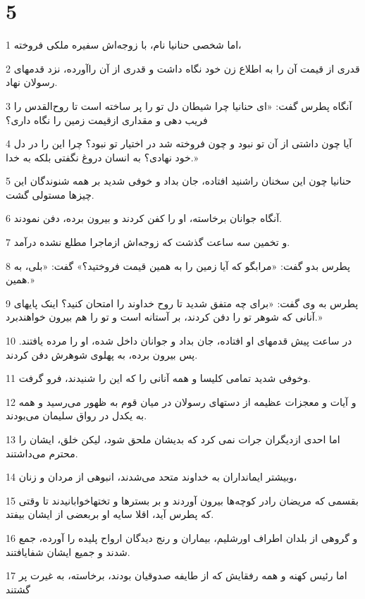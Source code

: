 \chapter{5}

\par 1 اما شخصی حنانیا نام، با زوجه‌اش سفیره ملکی فروخته،
\par 2 قدری از قیمت آن را به اطلاع زن خود نگاه داشت و قدری از آن راآورده، نزد قدمهای رسولان نهاد.
\par 3 آنگاه پطرس گفت: «ای حنانیا چرا شیطان دل تو را پر ساخته است تا روح‌القدس را فریب دهی و مقداری ازقیمت زمین را نگاه داری؟
\par 4 آیا چون داشتی از آن تو نبود و چون فروخته شد در اختیار تو نبود؟ چرا این را در دل خود نهادی؟ به انسان دروغ نگفتی بلکه به خدا.»
\par 5 حنانیا چون این سخنان راشنید افتاده، جان بداد و خوفی شدید بر همه شنوندگان این چیزها مستولی گشت.
\par 6 آنگاه جوانان برخاسته، او را کفن کردند و بیرون برده، دفن نمودند.
\par 7 و تخمین سه ساعت گذشت که زوجه‌اش ازماجرا مطلع نشده درآمد.
\par 8 پطرس بدو گفت: «مرابگو که آیا زمین را به همین قیمت فروختید؟» گفت: «بلی، به همین.»
\par 9 پطرس به وی گفت: «برای چه متفق شدید تا روح خداوند را امتحان کنید؟ اینک پایهای آنانی که شوهر تو را دفن کردند، بر آستانه است و تو را هم بیرون خواهندبرد.»
\par 10 در ساعت پیش قدمهای او افتاده، جان بداد و جوانان داخل شده، او را مرده یافتند. پس بیرون برده، به پهلوی شوهرش دفن کردند.
\par 11 وخوفی شدید تمامی کلیسا و همه آنانی را که این را شنیدند، فرو گرفت.
\par 12 و آیات و معجزات عظیمه از دستهای رسولان در میان قوم به ظهور می‌رسید و همه به یکدل در رواق سلیمان می‌بودند.
\par 13 اما احدی ازدیگران جرات نمی کرد که بدیشان ملحق شود، لیکن خلق، ایشان را محترم می‌داشتند.
\par 14 وبیشتر ایمانداران به خداوند متحد می‌شدند، انبوهی از مردان و زنان،
\par 15 بقسمی که مریضان رادر کوچه‌ها بیرون آوردند و بر بسترها و تختهاخوابانیدند تا وقتی که پطرس آید، اقلا سایه او بربعضی از ایشان بیفتد.
\par 16 و گروهی از بلدان اطراف اورشلیم، بیماران و رنج دیدگان ارواح پلیده را آورده، جمع شدند و جمیع ایشان شفایافتند.
\par 17 اما رئیس کهنه و همه رفقایش که از طایفه صدوقیان بودند، برخاسته، به غیرت پر گشتند
